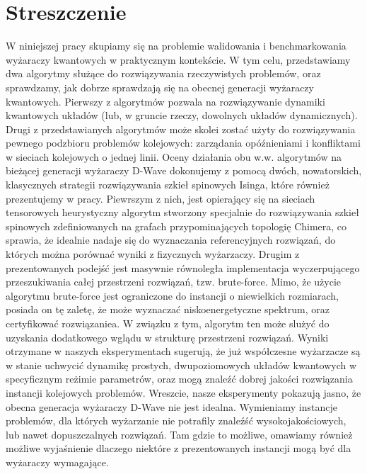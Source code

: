 \chapter{Streszczenie}

W niniejszej pracy skupiamy się na problemie walidowania i benchmarkowania wyżaraczy kwantowych w
praktycznym kontekście. W tym celu, przedstawiamy dwa algorytmy służące do rozwiązywania rzeczywistych
problemów, oraz sprawdzamy, jak dobrze sprawdzają się na obecnej generacji wyżaraczy kwantowych.
Pierwszy z algorytmów pozwala na rozwiązywanie dynamiki kwantowych układów (lub, w gruncie rzeczy,
dowolnych układów dynamicznych). Drugi z przedstawianych algorytmów może skolei zostać użyty do
rozwiązywania pewnego podzbioru problemów kolejowych:
zarządania opóźnieniami i konfliktami w sieciach kolejowych o jednej linii.
Oceny działania obu w.w. algorytmów na bieżącej generacji wyżaraczy D-Wave dokonujemy z pomocą dwóch,
nowatorskich, klasycznych strategii rozwiązywania szkieł spinowych Isinga, które również prezentujemy
w pracy. Piewrszym z nich, jest opierający się na sieciach tensorowych heurystyczny algorytm
stworzony specjalnie do rozwiązywania szkieł spinowych zdefiniowanych na grafach przypominających
topologię Chimera, co sprawia, że idealnie nadaje się do wyznaczania referencyjnych rozwiązań,
do których można porównać wyniki z fizycznych wyżarzaczy. Drugim z prezentowanych podejść jest masywnie
równoległa implementacja wyczerpującego przeszukiwania całej przestrzeni rozwiązań, tzw. brute-force.
Mimo, że użycie algorytmu brute-force jest ograniczone do instancji o niewielkich rozmiarach,
posiada on tę zaletę, że może wyznaczać niskoenergetyczne spektrum, oraz certyfikować rozwiązaniea.
W związku z tym, algorytm ten może slużyć do uzyskania dodatkowego wglądu w strukturę przestrzeni rozwiązań.
Wyniki otrzymane w naszych eksperymentach sugerują, że już współczesne wyżarzacze są w stanie
uchwycić dynamikę prostych, dwupoziomowych układów kwantowych w specyficznym reżimie parametrów,
oraz mogą znaleźć dobrej jakości rozwiązania instancji kolejowych problemów. Wreszcie, nasze eksperymenty
pokazują jasno, że obecna generacja wyżaraczy D-Wave nie jest idealna. Wymieniamy instancje problemów,
dla których wyżarzanie nie potrafily znaleźść wysokojakościowych, lub nawet dopuszczalnych rozwiązań.
Tam gdzie to możliwe, omawiamy również możliwe wyjaśnienie dlaczego niektóre z prezentowanych instancji
mogą być dla wyżaraczy wymagające.

